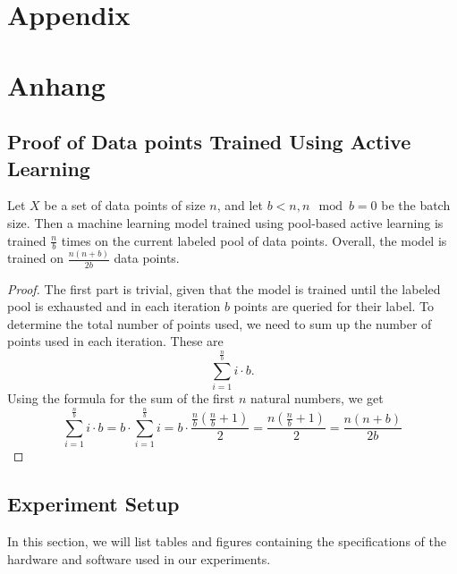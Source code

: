 
{\chapter{Appendix}}    %
{\chapter{Anhang}}      %
\label{chap:appendix}


\section{Proof of Data points Trained Using Active Learning}
\label{sec:appendix:FirstSection}
\begin{theorem}
Let $X$ be a set of data points of size $n$, and let $b < n, n \mod b = 0$ be the batch size. Then a machine learning model trained
using pool-based active learning is trained $\frac{n}{b}$ times on the current labeled pool of data points. Overall, the model
is trained on $\frac{n(n+b)}{2b}$ data points.
\end{theorem}
\begin{proof}
    The first part is trivial, given that the model is trained until the labeled pool is exhausted and in each iteration $b$
    points are queried for their label. To determine the total number of points used, we need to sum up the number of points
    used in each iteration. These are
    \begin{equation}
        \sum_{i=1}^{\frac{n}{b}} i \cdot b.
    \end{equation}
    Using the formula for the sum of the first $n$ natural numbers, we get
    \begin{equation}
        \sum_{i=1}^{\frac{n}{b}} i \cdot b = b \cdot \sum_{i=1}^{\frac{n}{b}} i = b \cdot \frac{\frac{n}{b} (\frac{n}{b} + 1)}{2}
        = \frac{n (\frac{n}{b} + 1)}{2} = \frac{n(n+b)}{2b}
    \end{equation}
\end{proof}

\section{Experiment Setup}
\label{sec:Appendix:Setup}
In this section, we will list tables and figures containing the specifications of the hardware and software used in our experiments.

